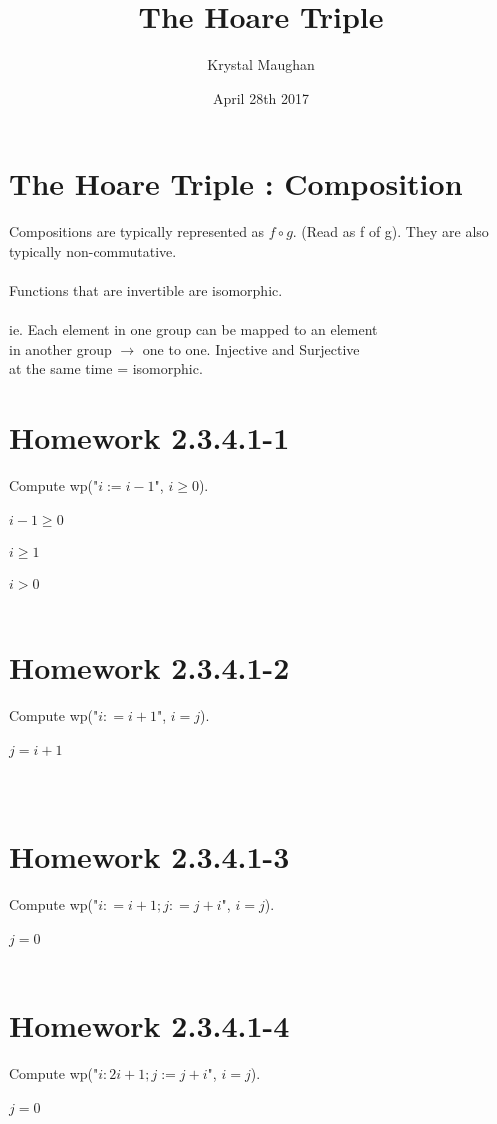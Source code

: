 \documentclass{article}
\title{The Hoare Triple}
\author{Krystal Maughan }
\date{April 28th 2017}
\begin{document}
\maketitle

\section{The Hoare Triple : Composition}
Compositions are typically  represented as \( f \circ g \).
(Read as f of g). They are also typically non-commutative.
\\
\\
Functions that are invertible are isomorphic.
\\
\\
ie. Each element in one group can be mapped to an element
\\
in another group $\rightarrow$ one to one.
Injective and Surjective
\\
at the same time = isomorphic.
\section{Homework 2.3.4.1-1}
Compute wp("$i := i - 1$", $i \geq 0$).
\\
\\
$i - 1 \geq 0$
\\
\\
$ i \geq 1$
\\
\\
$ i > 0$
\\
\\
\section{Homework 2.3.4.1-2}
Compute wp("$i : = i + 1$", $i = j$).
\\
\\
$j = i + 1$
\\
\\
\\
\section{Homework 2.3.4.1-3}
Compute wp("$i : = i + 1; j : = j + i$", $i = j$).
\\
\\
$j = 0$
\\
\\
\section{Homework 2.3.4.1-4}
Compute wp("$i : 2i + 1; j := j + i$", $i = j$).
\\
\\
$j = 0$
\\
\\
\end{document}
